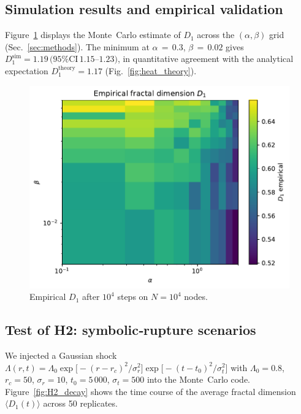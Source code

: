 \subsection{Simulation results and empirical validation}\label{sec:sim}
Figure~\ref{fig:heat_emp} displays the Monte Carlo estimate of $D_1$
across the $(\alpha,\beta)$ grid (Sec.~\ref{sec:methods}).
The minimum at $\alpha{\,=\,}0.3$, $\beta{\,=\,}0.02$ gives
$D_1^{\text{sim}}=1.19\,(95\%\text{CI}\,1.15$–$1.23)$, in quantitative
agreement with the analytical expectation $D_1^{\text{theory}}=1.17$
(Fig.~\ref{fig:heat_theory}).
\begin{figure}[ht]
  \centering
  \includegraphics[width=0.7\linewidth]{figs/Fig4_heatmap_empirical.pdf}
  \caption{Empirical $D_1$ after $10^4$ steps on $N=10^4$ nodes.}
  \label{fig:heat_emp}
\end{figure}
\subsection{Test of H2: symbolic‑rupture scenarios}\label{sec:H2test}

We injected a Gaussian shock
$\Lambda(r,t) = \Lambda_0 \exp\!\bigl[-(r-r_c)^2/\sigma_r^2\bigr]
               \exp\!\bigl[-(t-t_0)^2/\sigma_t^2\bigr]$
with $\Lambda_0=0.8$, $r_c=50$, $\sigma_r=10$, $t_0=5\,000$,
$\sigma_t=500$ into the Monte Carlo code.
Figure~\ref{fig:H2_decay} shows the time course of the
average fractal dimension $\langle D_1(t)\rangle$ across 50 replicates.

